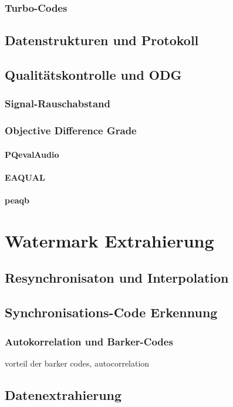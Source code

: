 \subsubsection{Turbo-Codes}

\subsection{Datenstrukturen und Protokoll}
\label{sec:protokoll}

\subsection{Qualitätskontrolle und ODG }

\subsubsection{Signal-Rauschabstand}

\subsubsection{Objective Difference Grade}

\paragraph{PQevalAudio}

\paragraph{EAQUAL}

\paragraph{peaqb}


\section{Watermark Extrahierung}
\label{sec:extraction}


\subsection{Resynchronisaton und Interpolation}

\subsection{Synchronisations-Code Erkennung}

\subsubsection{Autokorrelation und Barker-Codes}
\label{sec:barkercode}

vorteil der barker codes, autocorrelation

\subsection{Datenextrahierung}



